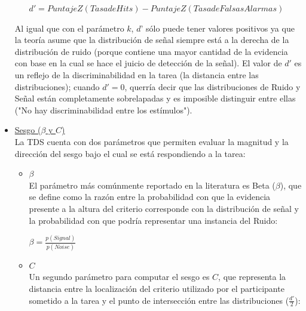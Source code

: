 \begin{itemize}
\begin{enumerate}
\begin{center}
$d' = PuntajeZ(Tasa de Hits) - PuntajeZ(Tasa de Falsas Alarmas)$\\
\end{center}

\end{enumerate}

Al igual que con el parámetro $k$, $d’$ sólo puede tener valores positivos ya que la teoría asume que la distribución de señal siempre está a la derecha de la distribución de ruido (porque contiene una mayor cantidad de la evidencia con base en la cual se hace el juicio de detección de la señal). El valor de $d'$ es un reflejo de la discriminabilidad en la tarea (la distancia entre las distribuciones); cuando $d' = 0$, querría decir que las distribuciones de Ruido y Señal están completamente sobrelapadas y es imposible distinguir entre ellas ("No hay discriminabilidad entre los estímulos"). \\

\item \underline{Sesgo ($\beta$ y $C$)}\\

La TDS cuenta con dos parámetros que permiten evaluar la magnitud y la dirección del sesgo bajo el cual se está respondiendo a la tarea:\\

\begin{itemize}
\item \underline{$\beta$}\\

El parámetro más comúnmente reportado en la literatura es Beta ($\beta$), que se define como la razón entre la probabilidad con que la evidencia presente a la altura del criterio corresponde con la distribución de señal y la probabilidad con que podría representar una instancia del Ruido: \\

\begin{center}
$\beta = \frac{p(Signal)}{p(Noise)}$ \\
\end{center}

\item \underline{$C$}\\

Un segundo parámetro para computar el sesgo es $C$, que representa la distancia entre la localización del criterio utilizado por el participante sometido a la tarea y el punto de intersección entre las distribuciones ($\frac{d'}{2}$):\\


\end{itemize}
\end{itemize}
